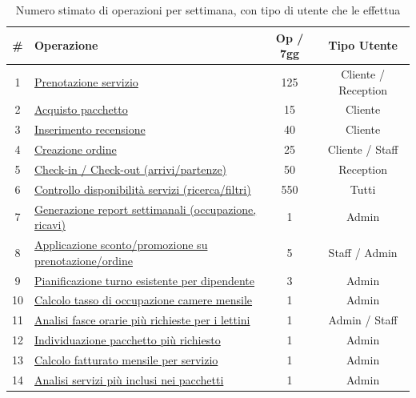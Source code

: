\documentclass[a4paper,12pt]{report}
\begin{document}
\begin{table}[H]
	\centering
	\small
	\renewcommand{\arraystretch}{1.12}
	\begin{tabularx}{\textwidth}{|c|>{\raggedright\arraybackslash}X|c|c|}
		\hline
		\rowcolor{gray!20}
		\textbf{\#} & \textbf{Operazione}                                                   & \textbf{Op / 7gg} & \textbf{Tipo Utente} \\
		\hline
		1           & \hyperref[op1]{Prenotazione servizio}                                 & 125               & Cliente / Reception  \\
		\hline
		2           & \hyperref[op2]{Acquisto pacchetto}                                    & 15                & Cliente              \\
		\hline
		3           & \hyperref[op3]{Inserimento recensione}                                & 40                & Cliente              \\
		\hline
		4           & \hyperref[op4]{Creazione ordine}                                      & 25                & Cliente / Staff      \\
		\hline
		5           & \hyperref[op5]{Check-in / Check-out (arrivi/partenze)}                & 50                & Reception            \\
		\hline
		6           & \hyperref[op6]{Controllo disponibilità servizi (ricerca/filtri)}      & 550               & Tutti                \\
		\hline
		7           & \hyperref[op7]{Generazione report settimanali (occupazione, ricavi)}  & 1                 & Admin                \\
		\hline
		8           & \hyperref[op8]{Applicazione sconto/promozione su prenotazione/ordine} & 5                 & Staff / Admin        \\
		\hline
		9           & \hyperref[op9]{Pianificazione turno esistente per dipendente}         & 3                 & Admin                \\
		\hline
		10          & \hyperref[op10]{Calcolo tasso di occupazione camere mensile}          & 1                 & Admin                \\
		\hline
		11          & \hyperref[op11]{Analisi fasce orarie più richieste per i lettini}     & 1                 & Admin / Staff        \\
		\hline
		12          & \hyperref[op12]{Individuazione pacchetto più richiesto}               & 1                 & Admin                \\
		\hline
		13          & \hyperref[op13]{Calcolo fatturato mensile per servizio}               & 1                 & Admin                \\
		\hline
		14          & \hyperref[op14]{Analisi servizi più inclusi nei pacchetti}            & 1                 & Admin                \\
		\hline
	\end{tabularx}
	\caption{Numero stimato di operazioni per settimana, con tipo di utente che le effettua}
	\label{tab:operazioni-settimanali}
\end{table}
\end{document}
